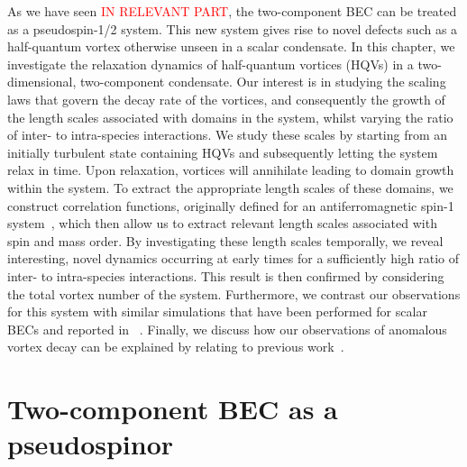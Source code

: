 As we have seen \textcolor{red}{IN RELEVANT PART}, the two-component BEC can be 
treated as a pseudospin-1/2 system. 
This new system gives rise to novel defects such as a half-quantum vortex 
otherwise unseen in a scalar condensate. 
In this chapter, we investigate the relaxation dynamics of half-quantum vortices 
(HQVs) in a two-dimensional, two-component condensate. 
Our interest is in studying the scaling laws that govern the decay rate of the 
vortices, and consequently the growth of the length scales associated with 
domains in the system, whilst varying the ratio of inter- to intra-species 
interactions. 
We study these scales by starting from an initially turbulent state containing
HQVs and subsequently letting the system relax in time.
Upon relaxation, vortices will annihilate leading to domain growth within 
the system.
To extract the appropriate length scales of these domains, we construct 
correlation functions, originally defined for an antiferromagnetic spin-1 
system~\cite{Symes2017}, which then allow us to extract relevant length scales
associated with spin and mass order.
By investigating these length scales temporally, we reveal interesting, 
novel dynamics occurring at early times for a sufficiently high ratio of 
inter- to intra-species interactions. 
This result is then confirmed by considering the total vortex number of the 
system. 
Furthermore, we contrast our observations for this system with similar
simulations that have been performed for scalar BECs and reported
in ~\cite{Schole2012, Nowak2012, Karl2017}.
Finally, we discuss how our observations of anomalous vortex decay can be
explained by relating to previous work~\cite{Eto2011, Kasamatsu2016}.


\section{Two-component BEC as a pseudospinor}\label{sec:two-component-bec-as-a-pseudospinor}

